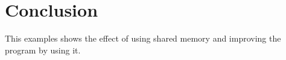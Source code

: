 \documentclass{article}
\begin{document}
\section{Conclusion} \label{conclusion}

This examples shows the effect of using shared memory and improving the program by using it.




%
%
%
%
%
\end{document}
